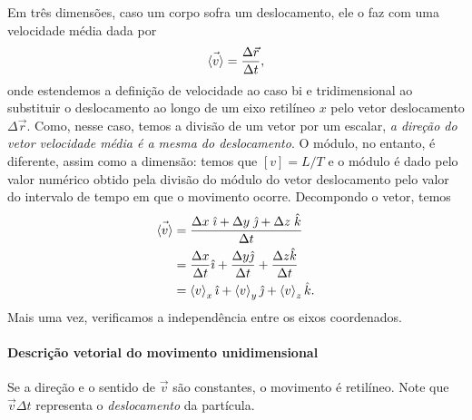 Em três dimensões, caso um corpo sofra um deslocamento, ele o faz com uma velocidade média dada por
\begin{equation}\label{Eq:VelMediaVetorial}
  \vec{\left\langle{v}\right\rangle} = \frac{\Delta\vec{r}}{\Delta t},
\end{equation}
%
onde estendemos a definição de velocidade ao caso bi e tridimensional ao substituir o deslocamento ao longo de um eixo retilíneo $x$ pelo vetor deslocamento $\Delta \vec{r}$. Como, nesse caso, temos a divisão de um vetor por um escalar, \emph{a direção do vetor velocidade média é a mesma do deslocamento}. O módulo, no entanto, é diferente, assim como a dimensão: temos que $[v] = L/T$ e o módulo é dado pelo valor numérico obtido pela divisão do módulo do vetor deslocamento pelo valor do intervalo de tempo em que o movimento ocorre. Decompondo o vetor, temos
\begin{align}
  \vec{\left\langle{v}\right\rangle} &= \frac{\Delta x \; \hat{\imath} + \Delta y \; \hat{\jmath} + \Delta z \; \hat{k}}{\Delta t} \\
  &= \frac{\Delta x}{\Delta t} \hat{\imath} + \frac{\Delta y\hat{\jmath}}{\Delta t} + \frac{\Delta z\hat{k}}{\Delta t} \\
  &= \left\langle{v}\right\rangle_x \hat{\imath} + \left\langle{v}\right\rangle_y \hat{\jmath} + \left\langle{v}\right\rangle_z \hat{k}.
\end{align}
%
Mais uma vez, verificamos a independência entre os eixos coordenados.

\paragraph{Descrição vetorial do movimento unidimensional}

\begin{marginfigure}
\centering
{}
\caption{Se a direção e o sentido de $\vec{v}$ são constantes, o movimento é retilíneo. Note que $\vec{v}\Delta t$ representa o \emph{deslocamento} da partícula.\label{Fig:DescricaoVetorialDoMovUnidimensional}}
\end{marginfigure}


